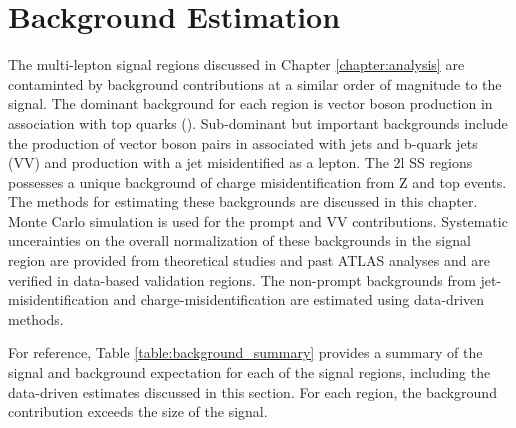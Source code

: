 \chapter[Background Estimation][Background Estimation]{Background Estimation}
\label{chapter:background}

The \tth multi-lepton signal regions discussed in Chapter \ref{chapter:analysis} are contaminted by background contributions at a similar order of magnitude to the signal. The dominant background for each region is vector boson production in association with top quarks (\ttV). Sub-dominant but important backgrounds include the production of vector boson pairs in associated with jets and b-quark jets (VV) and \ttbar production with a jet misidentified as a lepton. The 2l SS regions possesses a unique background of charge misidentification from Z and top events. The methods for estimating these backgrounds are discussed in this chapter. Monte Carlo simulation is used for the prompt \ttV and VV contributions. Systematic uncerainties on the overall normalization of these backgrounds in the signal region are provided from theoretical studies and past ATLAS analyses and are verified in data-based validation regions. The non-prompt backgrounds from \ttbar jet-misidentification and charge-misidentification are estimated using data-driven methods. 

For reference, Table \ref{table:background_summary} provides a summary of the \tth signal and background expectation for each of the signal regions, including the data-driven estimates discussed in this section. For each region, the background contribution exceeds the size of the signal. 


